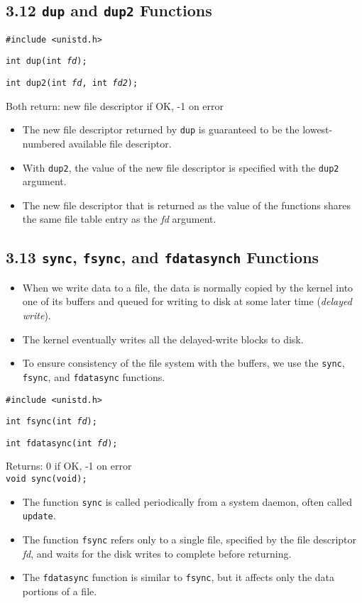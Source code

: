 \documentclass[]{article} \usepackage[all]{xy}
\newcommand{\code}{\texttt}
\begin{document}
\subsection*{3.12 \code{dup} and \code{dup2} Functions}
\code{\#include <unistd.h>}

\code{int dup(int \emph{fd});}

\code{int dup2(int \emph{fd}, int \emph{fd2});}

Both return: new file descriptor if OK, -1 on error

\begin{itemize}
\item The new file descriptor returned by \code{dup} is guaranteed to be the
lowest-numbered available file descriptor.
\item With \code{dup2}, the value of the new file descriptor is specified with
the \code{dup2} argument.
\item The new file descriptor that is returned as the value of the functions
shares the same file table entry as the \emph{fd} argument.
\end{itemize}

\subsection*{3.13 \code{sync}, \code{fsync}, and \code{fdatasynch}
Functions}
\begin{itemize}
\item When we write data to a file, the data is normally copied by the kernel
into one of its buffers and queued for writing to disk at some later time
(\emph{delayed write}).
\item The kernel eventually writes all the delayed-write blocks to disk.
\item To ensure consistency of the file system with the buffers, we use the
\code{sync}, \code{fsync}, and \code{fdatasync} functions.
\end{itemize}

\code{\#include <unistd.h>}

\code{int fsync(int \emph{fd});}

\code{int fdatasync(int \emph{fd});}

Returns: 0 if OK, -1 on error\\

\code{void sync(void);}

\begin{itemize}
\item The function \code{sync} is called periodically from a system daemon,
often called \code{update}.
\item The function \code{fsync} refers only to a single file, specified by the
file descriptor \emph{fd}, and waits for the disk writes to complete before
returning.
\item The \code{fdatasync} function is similar to \code{fsync}, but it affects
only the data portions of a file.
\end{itemize}
\end{document}
